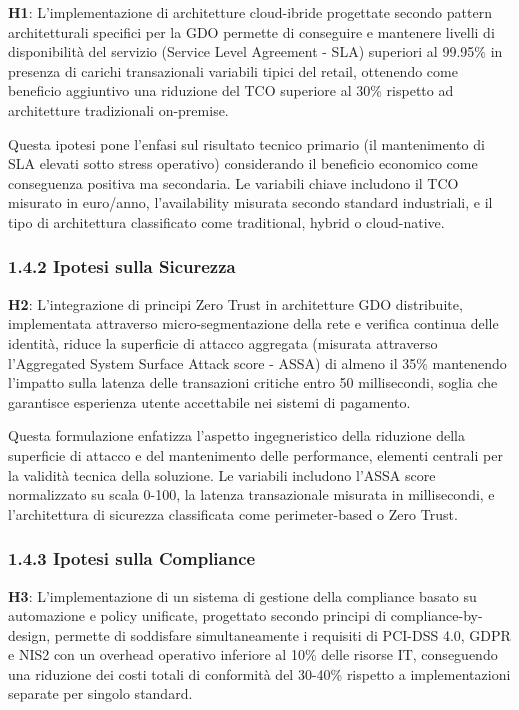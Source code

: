 \documentclass{report}
\begin{document}
\textbf{H1}: L'implementazione di architetture cloud-ibride progettate
secondo pattern architetturali specifici per la GDO permette di
conseguire e mantenere livelli di disponibilità del servizio (Service
Level Agreement - SLA) superiori al 99.95\% in presenza di carichi
transazionali variabili tipici del retail, ottenendo come beneficio
aggiuntivo una riduzione del TCO superiore al 30\% rispetto ad
architetture tradizionali on-premise.

Questa ipotesi pone l'enfasi sul risultato tecnico primario (il
mantenimento di SLA elevati sotto stress operativo) considerando il
beneficio economico come conseguenza positiva ma secondaria. Le
variabili chiave includono il TCO misurato in euro/anno, l'availability
misurata secondo standard industriali, e il tipo di architettura
classificato come traditional, hybrid o cloud-native.

\subsubsection{\texorpdfstring{\textbf{1.4.2 Ipotesi sulla
Sicurezza}}{1.4.2 Ipotesi sulla Sicurezza}}\label{ipotesi-sulla-sicurezza}

\textbf{H2}: L'integrazione di principi Zero Trust in architetture GDO
distribuite, implementata attraverso micro-segmentazione della rete e
verifica continua delle identità, riduce la superficie di attacco
aggregata (misurata attraverso l'Aggregated System Surface Attack score
- ASSA) di almeno il 35\% mantenendo l'impatto sulla latenza delle
transazioni critiche entro 50 millisecondi, soglia che garantisce
esperienza utente accettabile nei sistemi di pagamento.

Questa formulazione enfatizza l'aspetto ingegneristico della riduzione
della superficie di attacco e del mantenimento delle performance,
elementi centrali per la validità tecnica della soluzione. Le variabili
includono l'ASSA score normalizzato su scala 0-100, la latenza
transazionale misurata in millisecondi, e l'architettura di sicurezza
classificata come perimeter-based o Zero Trust.

\subsubsection{\texorpdfstring{\textbf{1.4.3 Ipotesi sulla
Compliance}}{1.4.3 Ipotesi sulla Compliance}}\label{ipotesi-sulla-compliance}

\textbf{H3}: L'implementazione di un sistema di gestione della
compliance basato su automazione e policy unificate, progettato secondo
principi di compliance-by-design, permette di soddisfare simultaneamente
i requisiti di PCI-DSS 4.0, GDPR e NIS2 con un overhead operativo
inferiore al 10\% delle risorse IT, conseguendo una riduzione dei costi
totali di conformità del 30-40\% rispetto a implementazioni separate per
singolo standard.
\end{document}
